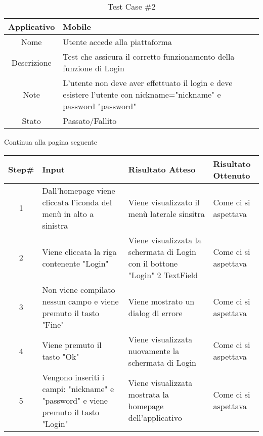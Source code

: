 
\begin{table}[H]
    \centering
    \footnotesize
    \caption{Test Case \#2}
    \begin{tabularx}{\textwidth}{|c|X|}
        \hline
        Applicativo & Mobile\\
        \hline
        Nome & Utente accede alla piattaforma  \\
        \hline
        Descrizione & Test che assicura il corretto funzionamento della funzione di Login\\
        \hline
        Note &  L'utente non deve aver effettuato il login e deve esistere l'utente
        con nickname="nickname" e password "password"\\
        \hline
        Stato & Passato/Fallito\\
        \hline

    \end{tabularx}
    Continua alla pagina seguente
    \setlength{\tabcolsep}{8pt}
    \renewcommand{\arraystretch}{1.5}
\end{table}
\begin{table}[H]
    \footnotesize
    \begin{tabularx}{\textwidth}{|c|X|X|X|}
        \hline
        Step\# & Input & Risultato Atteso & Risultato Ottenuto \\
        \hline
         1 & Dall'homepage viene cliccata l'iconda del menù in alto a sinistra 
         & Viene visualizzato il menù laterale sinsitra
         &Come ci si aspettava \\
          \hline
        2 & Viene cliccata la riga contenente "Login"
        & Viene visualizzata la schermata di Login con il bottone "Login" 2 TextField
        & Come ci si aspettava\\
         \hline 
        3 & Non viene compilato nessun campo e viene premuto il tasto "Fine"
         & Viene mostrato un dialog di errore & Come ci si aspettava\\
          \hline
        4 & Viene premuto il tasto "Ok"
         & Viene visualizzata nuovamente la schermata di Login
         & Come ci si aspettava\\
          \hline 
          5 & Vengono inseriti i campi: "nickname" e "password" e viene premuto il tasto "Login"
         & Viene visualizzata mostrata la homepage dell'applicativo
         & Come ci si aspettava\\
          \hline           
    \end{tabularx}
\end{table}
    
       
